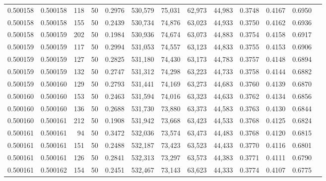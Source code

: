 \begin{tabular}{rrrrrrrrrrrrr}
0.500158 & 0.500158 &   118 &  50 &                                     0.2976 & 530,579 &  75,031 &  62,973 &  44,983 & 0.3748 & 0.4167 & 0.6950 \\
0.500158 & 0.500158 &   155 &  50 &                                     0.2439 & 530,734 &  74,876 &  63,023 &  44,933 & 0.3750 & 0.4162 & 0.6936 \\
0.500158 & 0.500159 &   202 &  50 &                                     0.1984 & 530,936 &  74,674 &  63,073 &  44,883 & 0.3754 & 0.4158 & 0.6917 \\
0.500159 & 0.500159 &   117 &  50 &                                     0.2994 & 531,053 &  74,557 &  63,123 &  44,833 & 0.3755 & 0.4153 & 0.6906 \\
0.500159 & 0.500159 &   127 &  50 &                                     0.2825 & 531,180 &  74,430 &  63,173 &  44,783 & 0.3757 & 0.4148 & 0.6894 \\
0.500159 & 0.500159 &   132 &  50 &                                     0.2747 & 531,312 &  74,298 &  63,223 &  44,733 & 0.3758 & 0.4144 & 0.6882 \\
0.500159 & 0.500160 &   129 &  50 &                                     0.2793 & 531,441 &  74,169 &  63,273 &  44,683 & 0.3760 & 0.4139 & 0.6870 \\
0.500160 & 0.500160 &   153 &  50 &                                     0.2463 & 531,594 &  74,016 &  63,323 &  44,633 & 0.3762 & 0.4134 & 0.6856 \\
0.500160 & 0.500160 &   136 &  50 &                                     0.2688 & 531,730 &  73,880 &  63,373 &  44,583 & 0.3763 & 0.4130 & 0.6844 \\
0.500160 & 0.500161 &   212 &  50 &                                     0.1908 & 531,942 &  73,668 &  63,423 &  44,533 & 0.3768 & 0.4125 & 0.6824 \\
0.500161 & 0.500161 &    94 &  50 &                                     0.3472 & 532,036 &  73,574 &  63,473 &  44,483 & 0.3768 & 0.4120 & 0.6815 \\
0.500161 & 0.500161 &   151 &  50 &                                     0.2488 & 532,187 &  73,423 &  63,523 &  44,433 & 0.3770 & 0.4116 & 0.6801 \\
0.500161 & 0.500161 &   126 &  50 &                                     0.2841 & 532,313 &  73,297 &  63,573 &  44,383 & 0.3771 & 0.4111 & 0.6790 \\
0.500161 & 0.500162 &   154 &  50 &                                     0.2451 & 532,467 &  73,143 &  63,623 &  44,333 & 0.3774 & 0.4107 & 0.6775 \\

\end{tabular}

